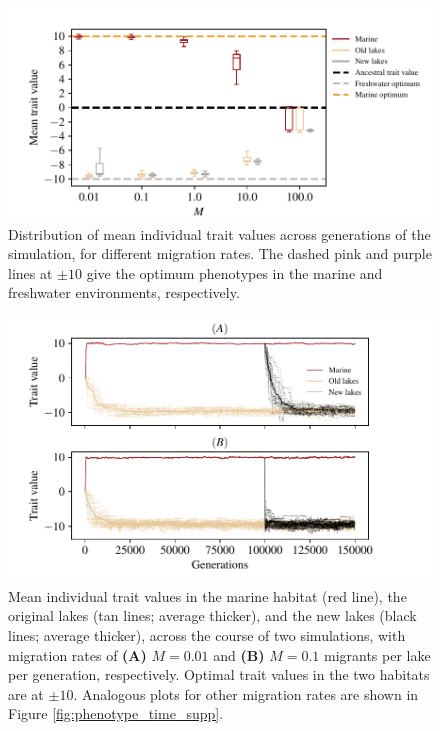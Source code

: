 \documentclass{article}
\begin{document}
\begin{figure}
    \begin{center}
          \includegraphics{Final_Plots/Pheno_Dist.pdf}
          \caption{
            Distribution of mean individual trait values across generations of the simulation,
            for different migration rates.
            The dashed pink and purple lines at $\pm 10$ give the optimum phenotypes
            in the marine and freshwater environments, respectively.
        }
          \label{fig:MeanPhenotype}
    \end{center}
\end{figure}

\begin{figure}
    \begin{center}
        \includegraphics{Final_Plots/Pheno_Time.pdf}
          \caption{ 
        Mean individual trait values in the marine habitat (red line),
                the original lakes (tan lines; average thicker),
                and the new lakes (black lines; average thicker),
                across the course of two simulations, with migration rates of
                \textbf{(A)} $M=0.01$ and
                \textbf{(B)} $M=0.1$ 
                migrants per lake per generation, respectively.
                Optimal trait values in the two habitats are at $\pm 10$.
                    Analogous plots for other migration rates
                    are shown in Figure \ref{fig:phenotype_time_supp}.
        }
          \label{fig:phenotype_time}
    \end{center}
\end{figure}
\end{document}
